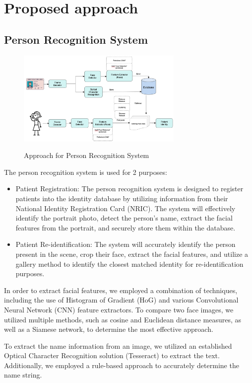 \documentclass{article}
\begin{document}
\section{Proposed approach}
\subsection{Person Recognition System}
\begin{figure}[tbh]
    \begin{center}
        \includegraphics[width=8cm]{person-recong.png}\
        \caption{Approach for Person Recognition System \label{figure2}} 
    \end{center}
\end{figure}
The person recognition system is used for 2 purposes:
\begin{itemize}
    \item Patient Registration: The person recognition system is designed to register patients into the identity database by utilizing information from their National Identity Registration Card (NRIC). The system will effectively identify the portrait photo, detect the person's name, extract the facial features from the portrait, and securely store them within the database.
    \item Patient Re-identification: The system will accurately identify the person present in the scene, crop their face, extract the facial features, and utilize a gallery method to identify the closest matched identity for re-identification purposes.
\end{itemize}
In order to extract facial features, we employed a combination of techniques, including the use of Histogram of Gradient (HoG) and various Convolutional Neural Network (CNN) feature extractors. To compare two face images, we utilized multiple methods, such as cosine and Euclidean distance measures, as well as a Siamese network, to determine the most effective approach.

To extract the name information from an image, we utilized an established Optical Character Recognition solution (Tesseract) to extract the text. Additionally, we employed a rule-based approach to accurately determine the name string.
\end{document}
